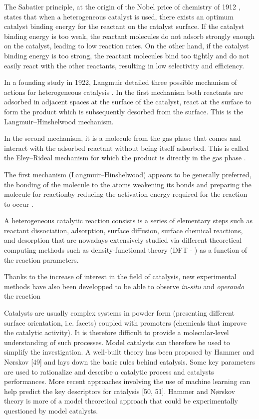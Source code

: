The Sabatier principle, at the origin of the Nobel price of chemistry of 1912 \parencite{Che2013}, states that when a heterogeneous catalyst is used, there exists an optimum catalyst binding energy for the reactant on the catalyst surface.
If the catalyst binding energy is too weak, the reactant molecules do not adsorb strongly enough on the catalyst, leading to low reaction rates.
On the other hand, if the catalyst binding energy is too strong, the reactant molecules bind too tightly and do not easily react with the other reactants, resulting in low selectivity and efficiency.

In a founding study in 1922, Langmuir detailed three possible mechanism of actions for heterogeneous catalysis \parencite{Langmuir1922, Prins2018}.
In the first mechanism both reactants are adsorbed in adjacent spaces at the surface of the catalyst, react at the surface to form the product which is subsequently desorbed from the surface.
This is the Langmuir–Hinshelwood mechanism.

In the second mechanism, it is a molecule from the gas phase that comes and interact with the adsorbed reactant without being itself adsorbed.
This is called the Eley–Rideal mechanism for which the product is directly in the gas phase \parencite{rideal_1939, Weinberg1996}.

The first mechanism (Langmuir–Hinshelwood) appears to be generally preferred, the bonding of the molecule to the atoms weakening its bonds and preparing the molecule for reactionby reducing the activation energy required for the reaction to occur \parencite{Baxter2002, Prins2018}.

A heterogeneous catalytic reaction consists is a series of elementary steps such as reactant dissociation, adsorption, surface diffusion, surface chemical reactions, and desorption that are nowadays extensively studied via different theoretical computing methods such as density-functional theory (DFT - \cite{Reuter2004, Molenbroek2009, Yawei2015, Gaggioli2019, Chatelier2020}) as a function of the reaction parameters.

Thanks to the increase of interest in the field of catalysis, new experimental methods have also been developped to be able to observe \textit{in-situ} and \textit{operando} the reaction

Catalysts are usually complex systems in powder form (presenting different surface orientation, i.e. facets) coupled with promoters (chemicals that improve the catalytic activity).
It is therefore difficult to provide a molecular-level understanding of such processes.
Model catalysts can therefore be used to simplify the investigation.
A well-built theory has been proposed by Hammer and Nørskov [49] and lays down the basic rules behind catalysis.
Some key parameters are used to rationalize and describe a catalytic process and catalysts performances.
More recent approaches involving the use of machine learning can help predict the key descriptors for catalysis [50, 51].
Hammer and Nørskov theory is more of a model theoretical approach that could be experimentally questioned by model catalysts.

